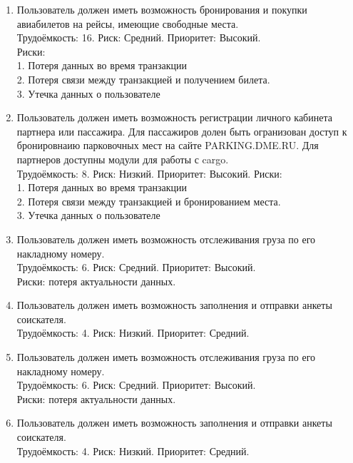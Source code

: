 \begin{enumerate}
    \item Пользователь должен иметь возможность бронирования и 
          покупки авиабилетов на рейсы, имеющие свободные места. \\
          Трудоёмкость: 16. Риск: Средний. Приоритет: Высокий. \\
          Риски: \\
          1. Потеря данных во время транзакции \\
          2. Потеря связи между транзакцией и получением билета.\\
          3. Утечка данных о пользователе

    \item Пользователь должен иметь возможность регистрации личного 
          кабинета партнера или пассажира. Для пассажиров долен быть 
          огранизован доступ к бронировнаию парковочных мест на сайте 
          PARKING.DME.RU. Для партнеров доступны модули для работы с cargo. \\
          Трудоёмкость: 8. Риск: Низкий. Приоритет: Высокий.
          Риски: \\
          1. Потеря данных во время транзакции \\
          2. Потеря связи между транзакцией и бронированием места. \\
          3. Утечка данных о пользователе
          
    \item Пользователь должен иметь возможность отслеживания груза 
          по его накладному номеру. \\
          Трудоёмкость: 6. Риск: Средний. Приоритет: Высокий. \\
          Риски: потеря актуальности данных.

    \item Пользователь должен иметь возможность заполнения и отправки 
          анкеты соискателя. \\
          Трудоёмкость: 4. Риск: Низкий. Приоритет: Средний.

    \item Пользователь должен иметь возможность отслеживания груза 
          по его накладному номеру. \\
          Трудоёмкость: 6. Риск: Средний. Приоритет: Высокий. \\
          Риски: потеря актуальности данных.

    \item Пользователь должен иметь возможность заполнения и отправки 
          анкеты соискателя. \\
          Трудоёмкость: 4. Риск: Низкий. Приоритет: Средний.


\end{enumerate}
